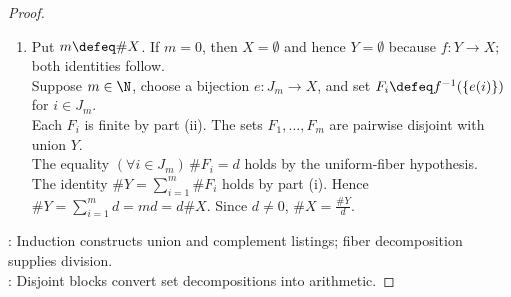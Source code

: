 \begin{proposition}
\begin{proof}
\begin{enumerate}[label=(\roman*)]
Assume $P_r$, let $\#A=r$, and choose a bijection $e:J_r\to A$. Put $a\defeq e(r)$ and $A'\defeq A\setminus\{a\}$.\\
The restriction $\left.e\right|_{J_{r-1}}:J_{r-1}\to A'$ is bijective, so $\#A'=r-1$. If $a\in B$, put $B'\defeq B\setminus\{a\}$.\\
By $P_r$, the sets $B'$ and $A'\setminus B'$ are finite and $\#(A'\setminus B')=\#A'-\#B'$.\\
By part (i) for $B=B'\cup\{a\}$, $B$ is finite with $\#B=\#B'+1$.\\
Since $A\setminus B=A'\setminus B'$, the set $A\setminus B$ is finite and $\#(A\setminus B)=(r-1)-(\#B-1)=\#A-\#B$.\\
If $a\notin B$, then $B$ and $A'\setminus B$ are finite with $\#(A'\setminus B)=\#A'-\#B$ by $P_r$.\\
By part (i) for $A\setminus B=(A'\setminus B)\cup\{a\}$, $\#(A\setminus B)=((r-1)-\#B)+1=\#A-\#B$.\\
Thus $P_{r+1}$ holds. Consequently, $(\forall r\in\N)\,P_r$ by Theorem \ref{thm:mathematical-induction}.\\
An arbitrary finite $A$ and subset $B\subseteq A$ satisfy $P_{\#A+1}$, proving claim (ii).
\item Put $m\defeq\#X$. If $m=0$, then $X=\emptyset$ and hence $Y=\emptyset$ because $f:Y\to X$; both identities follow.\\
Suppose $m\in\N$, choose a bijection $e:J_m\to X$, and set $F_i\defeq f^{-1}(\{e(i)\})$ for $i\in J_m$.\\
Each $F_i$ is finite by part (ii). The sets $F_1,\ldots,F_m$ are pairwise disjoint with union $Y$.\\
The equality $(\forall i\in J_m)\,\#F_i=d$ holds by the uniform-fiber hypothesis.\\
The identity $\#Y=\sum\limits_{i=1}^{m}\#F_i$ holds by part (i). Hence $\#Y=\sum\limits_{i=1}^{m}d=md=d\#X$. Since $d\neq0$, $\#X=\frac{\#Y}{d}$.
\end{enumerate}
: Induction constructs union and complement listings; fiber decomposition supplies division.\\
: Disjoint blocks convert set decompositions into arithmetic.
\end{proof}
\end{proposition}

